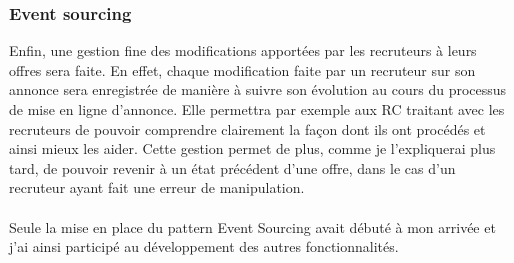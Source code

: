 \subsubsection{Event sourcing}
\label{subs:Event sourcing}
Enfin, une gestion fine des modifications apportées par les recruteurs à leurs offres sera faite.
En effet, chaque modification faite par un recruteur sur son annonce sera enregistrée de manière à suivre son évolution au cours du processus de mise en ligne d'annonce.
Elle permettra par exemple aux RC traitant avec les recruteurs de pouvoir comprendre clairement la façon dont ils ont procédés et ainsi mieux les aider.
Cette gestion permet de plus, comme je l'expliquerai plus tard, de pouvoir revenir à un état précédent d'une offre, dans le cas d'un recruteur ayant fait une erreur de manipulation.

\paragraph{}
Seule la mise en place du pattern Event Sourcing avait débuté à mon arrivée et j'ai ainsi participé au développement des autres fonctionnalités.
